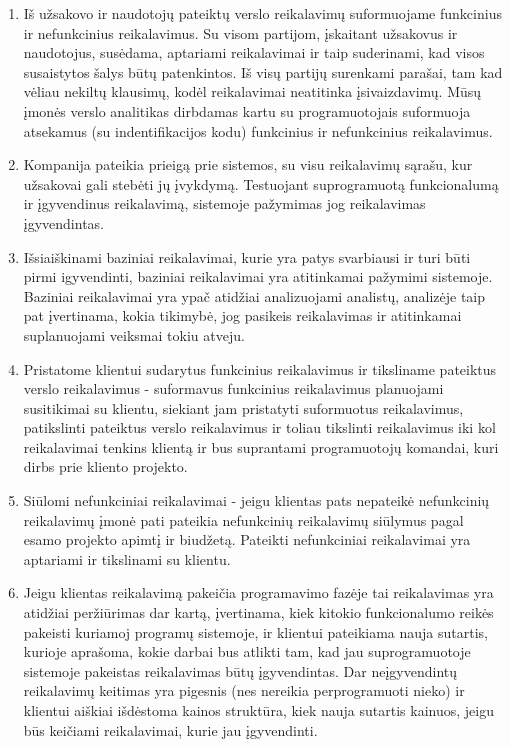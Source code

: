 \documentclass{VUMIFPSkursinis}
\begin{document}
	\begin{enumerate}
		\item{
			Iš užsakovo ir naudotojų pateiktų verslo reikalavimų suformuojame funkcinius ir nefunkcinius reikalavimus.
			Su visom partijom, įskaitant užsakovus ir naudotojus, susėdama, aptariami reikalavimai ir taip suderinami, kad visos susaistytos šalys būtų patenkintos.
			Iš visų partijų surenkami parašai, tam kad vėliau nekiltų klausimų, kodėl reikalavimai neatitinka įsivaizdavimų.
			Mūsų įmonės verslo analitikas dirbdamas kartu su programuotojais suformuoja atsekamus (su indentifikacijos kodu) funkcinius ir nefunkcinius reikalavimus.
		}
		\item{
			Kompanija pateikia prieigą prie sistemos, su visu reikalavimų sąrašu, kur užsakovai gali stebėti jų įvykdymą.
			Testuojant suprogramuotą funkcionalumą ir įgyvendinus reikalavimą, sistemoje pažymimas jog reikalavimas įgyvendintas.
		}
		\item{
			Išsiaiškinami baziniai reikalavimai, kurie yra patys svarbiausi ir turi būti pirmi igyvendinti, baziniai reikalavimai yra atitinkamai pažymimi sistemoje.
			Baziniai reikalavimai yra ypač atidžiai analizuojami analistų, analizėje taip pat įvertinama, kokia tikimybė, jog pasikeis reikalavimas ir atitinkamai suplanuojami veiksmai tokiu atveju.
		}
		\item{
			Pristatome klientui sudarytus funkcinius reikalavimus ir tiksliname pateiktus verslo reikalavimus - suformavus funkcinius reikalavimus planuojami susitikimai su klientu, siekiant jam pristatyti suformuotus reikalavimus, patikslinti pateiktus verslo reikalavimus ir toliau tikslinti reikalavimus iki kol reikalavimai tenkins klientą ir bus suprantami programuotojų komandai, kuri dirbs prie kliento projekto.
		}
		\item{
			Siūlomi nefunkciniai reikalavimai - jeigu klientas pats nepateikė nefunkcinių reikalavimų įmonė pati pateikia nefunkcinių reikalavimų siūlymus pagal esamo projekto apimtį ir biudžetą.
			Pateikti nefunkciniai reikalavimai yra aptariami ir tikslinami su klientu.
		}
		\item{
			Jeigu klientas reikalavimą pakeičia programavimo fazėje tai reikalavimas yra atidžiai peržiūrimas dar kartą, įvertinama, kiek kitokio funkcionalumo reikės pakeisti kuriamoj programų sistemoje, ir klientui pateikiama nauja sutartis, kurioje aprašoma, kokie darbai bus atlikti tam, kad jau suprogramuotoje sistemoje pakeistas reikalavimas būtų įgyvendintas.
			Dar neįgyvendintų reikalavimų keitimas yra pigesnis (nes nereikia perprogramuoti nieko) ir klientui aiškiai išdėstoma kainos struktūra, kiek nauja sutartis kainuos, jeigu būs keičiami reikalavimai, kurie jau įgyvendinti.
		}
	\end{enumerate}
\end{document}
